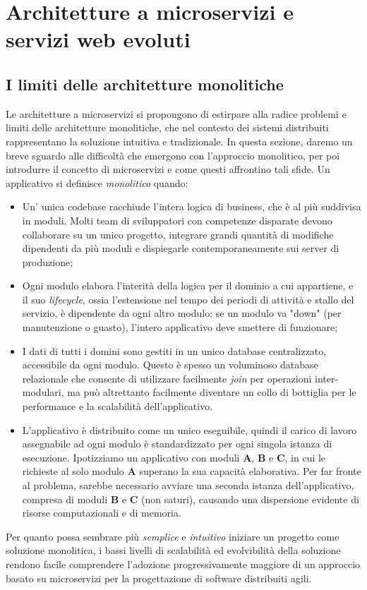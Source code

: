 \chapter{Architetture a microservizi e servizi web evoluti}
\section{I limiti delle architetture monolitiche}
Le architetture a microservizi si propongono di estirpare alla radice problemi e limiti delle architetture monolitiche, che nel contesto dei sistemi distribuiti rappresentano la soluzione intuitiva e tradizionale. In questa sezione, daremo un breve sguardo alle difficoltà che emergono con l'approccio monolitico, per poi introdurre il concetto di microservizi e come questi affrontino tali sfide.
Un applicativo si definisce \emph{monolitico} quando:

\begin{itemize}
    \item Un' unica codebase racchiude l'intera logica di business, che è al più suddivisa in moduli. Molti team di sviluppatori con competenze disparate devono collaborare su un unico progetto, integrare grandi quantità di modifiche dipendenti da più moduli e dispiegarle contemporaneamente sui server di produzione;
    \item Ogni modulo elabora l'interità della logica per il dominio a cui appartiene, e il suo \emph{lifecycle}, ossia l'estensione nel tempo dei periodi di attività e stallo del servizio, è dipendente da ogni altro modulo: se un modulo va "down" (per manutenzione o guasto), l'intero applicativo deve smettere di funzionare;
    \item I dati di tutti i domini sono gestiti in un unico database centralizzato, accessibile da ogni modulo. Questo è spesso un voluminoso database relazionale che consente di utilizzare facilmente \emph{join} per operazioni inter-modulari, ma può altrettanto facilmente diventare un collo di bottiglia per le performance e la scalabilità dell'applicativo.
    \item L'applicativo è distribuito come un unico eseguibile, quindi il carico di lavoro assegnabile ad ogni modulo è standardizzato per ogni singola istanza di esecuzione.
    Ipotizziamo un applicativo con moduli \textbf{A}, \textbf{B} e \textbf{C}, in cui le richieste al solo modulo \textbf{A} superano la sua capacità elaborativa. Per far fronte al problema, sarebbe necessario avviare una seconda istanza dell'applicativo, compresa di moduli \textbf{B} e \textbf{C} (non saturi), causando una dispersione evidente di risorse computazionali e di memoria.
\end{itemize}
Per quanto possa sembrare più \emph{semplice} e \emph{intuitivo} iniziare un progetto come soluzione monolitica, i bassi livelli di scalabilità ed evolvibilità della soluzione rendono facile comprendere l'adozione progressivamente maggiore di un approccio basato su microservizi per la progettazione di software distribuiti agili.

